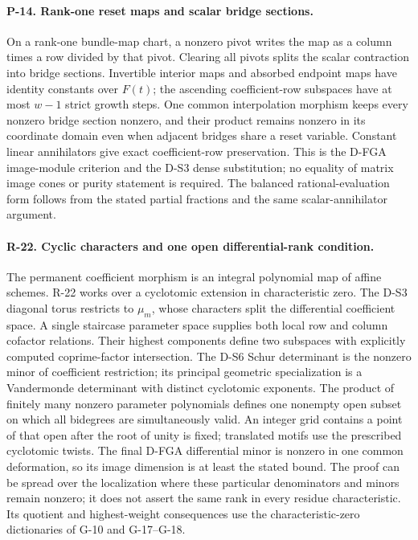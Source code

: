 \paragraph{P-14. Rank-one reset maps and scalar bridge sections.}
On a rank-one bundle-map chart, a nonzero pivot writes the map as a
column times a row divided by that pivot. Clearing all pivots splits
the scalar contraction into bridge sections. Invertible interior maps
and absorbed endpoint maps have identity constants over $F(t)$; the
ascending coefficient-row subspaces have at most $w-1$ strict growth
steps. One common interpolation morphism keeps every nonzero bridge
section nonzero, and their product remains nonzero in its coordinate
domain even when adjacent bridges share a reset variable. Constant
linear annihilators give exact coefficient-row preservation. This is
the D-FGA image-module criterion and the D-S3 dense substitution; no
equality of matrix image cones or purity statement is required. The
balanced rational-evaluation form follows from the stated partial
fractions and the same scalar-annihilator argument.


\paragraph{R-22. Cyclic characters and one open differential-rank condition.}
The permanent coefficient morphism is an integral polynomial map of
affine schemes. R-22 works over a cyclotomic extension in characteristic
zero. The D-S3 diagonal torus restricts to $\mu_m$, whose characters
split the differential coefficient space. A single staircase parameter
space supplies both local row and column cofactor relations. Their
highest components define two subspaces with explicitly computed
coprime-factor intersection. The D-S6 Schur determinant is the nonzero
minor of coefficient restriction; its principal geometric specialization
is a Vandermonde determinant with distinct cyclotomic exponents.
The product of finitely many nonzero parameter polynomials defines one
nonempty open subset on which all bidegrees are simultaneously valid.
An integer grid contains a point of that open after the root of unity
is fixed; translated motifs use the prescribed cyclotomic twists.
The final D-FGA differential minor is nonzero in one common deformation,
so its image dimension is at least the stated bound. The proof can be
spread over the localization where these particular denominators and
minors remain nonzero; it does not assert the same rank in every residue
characteristic. Its quotient and highest-weight consequences use the
characteristic-zero dictionaries of G-10 and G-17--G-18.

